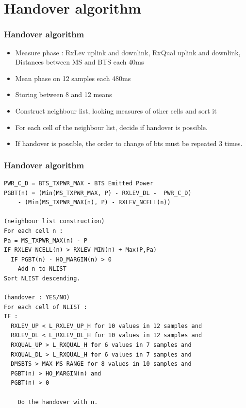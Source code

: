 \documentclass{beamer}
\begin{document}
\section{Handover algorithm}

\begin{frame}
\frametitle{Handover algorithm}

\begin{itemize}
  \item Measure phase : RxLev uplink and downlink, RxQual uplink and downlink, Distances between MS and BTS each 40ms
  \item Mean phase on 12 samples each 480ms
  \item Storing between 8 and 12 means
  \item Construct neighbour list, looking measures of other cells and sort it
  \item For each cell of the neighbour list, decide if handover is possible.
  \item If handover is possible, the order to change of bts must be repeated 3
times.
\end{itemize}
\end{frame}
\begin{frame}[fragile]
\frametitle{Handover algorithm}

{\tiny
\begin{verbatim}
PWR_C_D = BTS_TXPWR_MAX - BTS Emitted Power
PGBT(n) = (Min(MS_TXPWR_MAX, P) - RXLEV_DL -  PWR_C_D)
    - (Min(MS_TXPWR_MAX(n), P) - RXLEV_NCELL(n))

(neighbour list construction)
For each cell n :
Pa = MS_TXPWR_MAX(n) - P
IF RXLEV_NCELL(n) > RXLEV_MIN(n) + Max(P,Pa)
  IF PGBT(n) - HO_MARGIN(n) > 0
    Add n to NLIST
Sort NLIST descending.

(handover : YES/NO)
For each cell of NLIST :
IF :
  RXLEV_UP < L_RXLEV_UP_H for 10 values in 12 samples and
  RXLEV_DL < L_RXLEV_DL_H for 10 values in 12 samples and
  RXQUAL_UP > L_RXQUAL_H for 6 values in 7 samples and 
  RXQUAL_DL > L_RXQUAL_H for 6 values in 7 samples and
  DMSBTS > MAX_MS_RANGE for 8 values in 10 samples and
  PGBT(n) > HO_MARGIN(n) and
  PGBT(n) > 0

    Do the handover with n.
\end{verbatim}
}

\end{frame}

\end{document}
